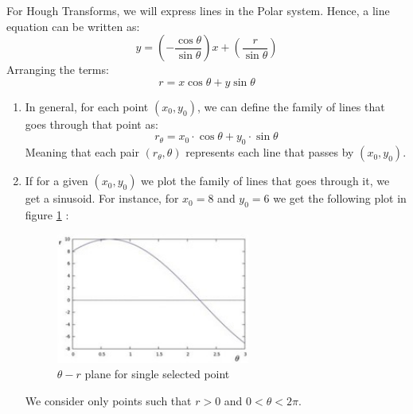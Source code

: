 For Hough Transforms, we will express lines in the Polar system. Hence, a line equation can be written as:\\
\[
y = \left(-\frac{\cos\theta}{\sin\theta}\right) x + \left(\frac{r}{\sin\theta}\right)
\]
Arranging the terms:
\[
r = x \cos\theta + y \sin\theta
\]

\begin{enumerate}
    \item In general, for each point \((x_0, y_0)\), we can define the family of lines that goes through that point as:
    \[
    r_\theta = x_0 \cdot \cos\theta + y_0 \cdot \sin\theta
    \]
    Meaning that each pair \((r_\theta, \theta)\) represents each line that passes by \((x_0, y_0)\).

    \clearpage
    \item If for a given \((x_0, y_0)\) we plot the family of lines that goes through it, we get a sinusoid. For instance, for \(x_0 = 8\) and \(y_0 = 6\) we get the following plot in figure  \ref{fig333} :

    \begin{figure}[h!]
     \centering
        \includegraphics[width=0.6\textwidth]{Picture2.jpg}
        \caption{\(\theta - r\) plane for single selected point}
        \label{fig333}
    \end{figure}

    We consider only points such that \(r > 0\) and \(0 < \theta < 2\pi\).
    

\end{enumerate}
